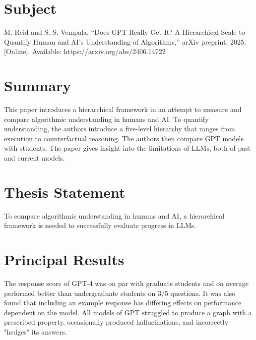\documentclass[12pt, letterpaper]{article}
\begin{document}
\pagestyle{empty}
\singlespacing
\vspace{1.0cm}

\newgeometry{} %


\section{Subject}
\label{sec:subject}
M. Reid and S. S. Vempala, “Does GPT Really Get It? A Hierarchical Scale to Quantify Human and AI’s Understanding of Algorithms,” arXiv preprint, 2025. [Online]. Available: https://arxiv.org/abs/2406.14722

\section{Summary}
\label{sec:summary}
This paper introduces a hierarchical framework in an attempt to measure and compare algorithmic understanding in humans and AI. To quantify understanding, the authors introduce a five-level hierarchy that ranges from execution to counterfactual reasoning. The authors then compare GPT models with students. The paper gives insight into the limitations of LLMs, both of past and current models.

\section{Thesis Statement}
\label{sec:thesis}
To compare algorithmic understanding in humans and AI, a hierarchical framework is needed to successfully evaluate progress in LLMs.

\section{Principal Results}
\label{sec:principal}
The response score of GPT-4 was on par with graduate students and on average performed better than undergraduate students on 3/5 questions. It was also found that including an example response has differing effects on performance dependent on the model. All models of GPT struggled to produce a graph with a prescribed property, occasionally produced hallucinations, and incorrectly "hedges" its answers.
\end{document}

